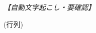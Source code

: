 \documentclass[../../main.tex]{subfiles}
\begin{document}
\begin{oframed}
  
\end{oframed}

\begin{flushright}
  \footnotesize\textit{【自動文字起こし・要確認】}
\end{flushright}

(行列)
\end{document}
